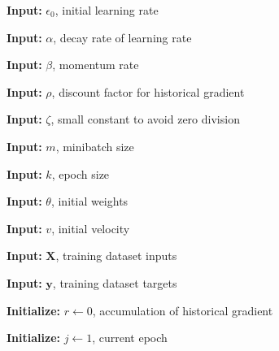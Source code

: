 \documentclass{article}
\begin{document}
    \setlength{\interspacetitleruled}{-.4pt}
    \begin{algorithm}

    
    \textbf{Input:}
    $\epsilon_{0}$, initial learning rate
    
    \textbf{Input:}
    $\alpha$, decay rate of learning rate
    
    \textbf{Input:}
    $\beta$, momentum rate
    
    \textbf{Input:}
    $\rho$, discount factor for historical gradient

    \textbf{Input:}
    $\zeta$, small constant to avoid zero division
    
    \textbf{Input:}
    $m$, minibatch size
    
	\textbf{Input:}
    $k$, epoch size
    
    \textbf{Input:}
    $\theta$, initial weights
    
    \textbf{Input:}
    $v$, initial velocity
     
    \textbf{Input:}
    $\mathbf{X}$, training dataset inputs
    
    \textbf{Input:}
    $\mathbf{y}$, training dataset targets
    
    \textbf{Initialize:}
    $r \gets 0$, accumulation of historical gradient
    
    \textbf{Initialize:}
	$j \gets 1$, current epoch
	


    \end{algorithm}    
    
\end{document}
